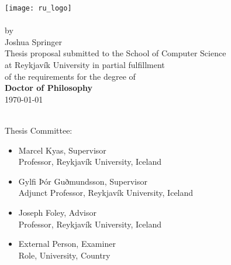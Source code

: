 \begin{titlepage}
    \Large
   \begin{center}

       \vspace*{1cm}

       \texttt{[image: ru\_logo]}~\\[1cm]
       \textbf{\documenttitle}
       ~\\[0.5cm]
       by
       ~\\[0.5cm]
       Joshua Springer
       ~\\[1cm]
       Thesis proposal submitted to the School of Computer Science\\
       at Reykjavík University in partial fulfillment\\
       of the requirements for the degree of\\
       \textbf{Doctor of Philosophy}
       ~\\[0.5cm]
       \specialdate\today
   \end{center}
~\\[0.5cm]
Thesis Committee:
\begin{itemize}[label=\null, leftmargin=1.75cm]
    \item Marcel Kyas, Supervisor\\Professor, Reykjavík University, Iceland
    \item Gylfi Þór Guðmundsson, Supervisor\\Adjunct Professor, Reykjavík University, Iceland
    \item Joseph Foley, Advisor\\Professor, Reykjavík University, Iceland
    \item External Person, Examiner\\Role, University, Country
\end{itemize}

\end{titlepage}